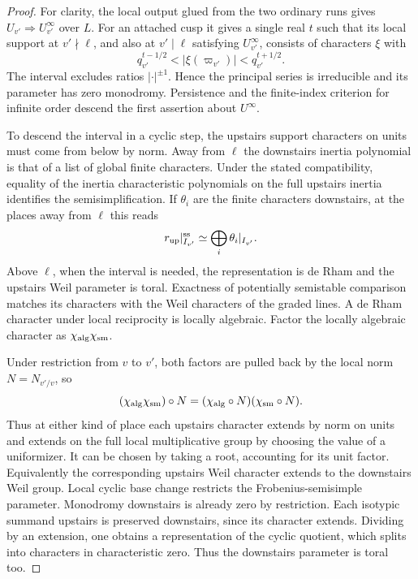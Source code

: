 \begin{proof}
For clarity, the local output glued from the two ordinary
runs gives \(U_{v'}\Rightarrow U_{v'}^\infty\) over \(L\).
For an attached cusp it gives a single real \(t\) such
that its local support at \(v'\nmid\ell\), and also at
\(v'\mid\ell\) satisfying \(U_{v'}^\infty\), consists of
characters \(\xi\) with
\[
           q_{v'}^{t-1/2}<|\xi(\varpi_{v'})|
                          <q_{v'}^{t+1/2}.
\]
The interval excludes ratios \(|\cdot|^{\pm1}\). Hence
the principal series is irreducible and its parameter
has zero monodromy. Persistence and the finite-index
criterion for infinite order descend the first assertion
about \(U^\infty\).

To descend the interval in a cyclic step, the upstairs
support characters on units must come from below by norm.
Away from \(\ell\) the downstairs inertia polynomial is
that of a list of global finite characters. Under the stated compatibility, equality of the inertia characteristic polynomials on the full upstairs inertia identifies the semisimplification. If \(\theta_i\) are the finite characters downstairs, at the places away from \(\ell\) this reads
\[
 r_{\rm up}|_{I_{v'}}^{\rm ss}\simeq\bigoplus_i\theta_i|_{I_{v'}} .
\] Above \(\ell\), when
the interval is needed, the representation is de Rham
and the upstairs Weil parameter is toral. Exactness of
potentially semistable comparison matches its characters
with the Weil characters of the graded lines. A de Rham
character under local reciprocity is locally algebraic.
Factor the locally algebraic character as \(\chi_{\rm alg}\chi_{\rm sm}\).

Under restriction from \(v\) to \(v'\), both factors are pulled back by the local norm \(N=N_{v'/v}\), so
\[
 (\chi_{\rm alg}\chi_{\rm sm})\circ N=(\chi_{\rm alg}\circ N)(\chi_{\rm sm}\circ N).
\]
Thus at either kind of place each upstairs character
extends by norm on units and extends on the full local
multiplicative group by choosing the value of a uniformizer. It can be
chosen by taking a root, accounting for its unit factor.
Equivalently the corresponding upstairs Weil character
extends to the downstairs Weil group. Local cyclic base
change restricts the Frobenius-semisimple parameter.
Monodromy downstairs is already zero by restriction.
Each isotypic summand upstairs is preserved downstairs,
since its character extends. Dividing by an extension,
one obtains a representation of the cyclic quotient,
which splits into characters in characteristic zero.
Thus the downstairs parameter is toral too.


\end{proof}
